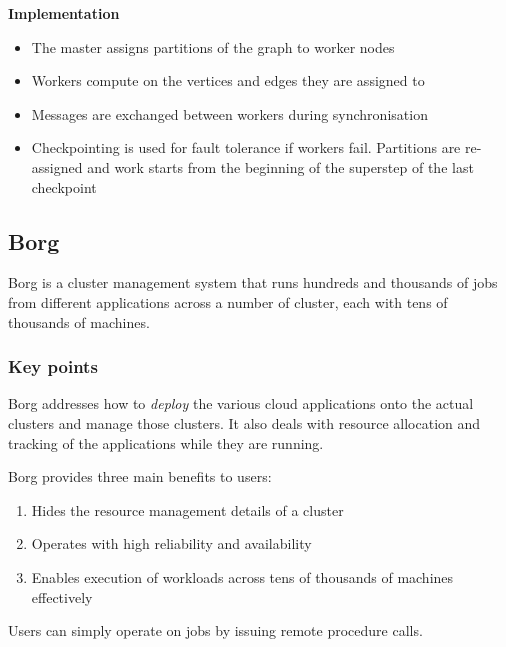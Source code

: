 \documentclass{sty/SizheArticle}
\begin{document}
\textbf{Implementation} \\
\begin{itemize}
\item The master assigns partitions of the graph to worker nodes
\item Workers compute on the vertices and edges they are assigned to
\item Messages are exchanged between workers during synchronisation
\item Checkpointing is used for fault tolerance if workers fail. Partitions
are re-assigned and work starts from the beginning of the superstep of the last
checkpoint
\end{itemize}

\subsection{Borg}
Borg is a cluster management system that runs hundreds and thousands of jobs
from different applications across a number of cluster, each with tens of
thousands of machines.

\subsubsection{Key points}
Borg addresses how to \textit{deploy} the various cloud applications
onto the actual clusters and manage those clusters. It also deals with
resource allocation and tracking of the applications while they are running.

Borg provides three main benefits to users:
\begin{enumerate}
\item Hides the resource management details of a cluster
\item Operates with high reliability and availability
\item Enables execution of workloads across tens of thousands of machines
effectively
\end{enumerate}
Users can simply operate on jobs by issuing remote procedure calls.
\end{document}
